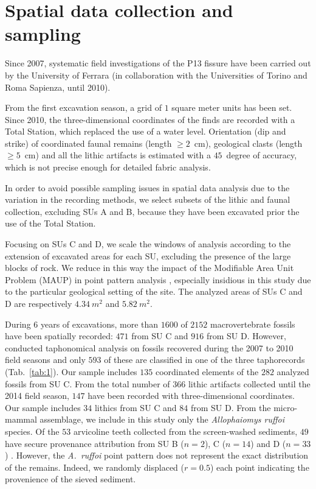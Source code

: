 \documentclass[review,authoryear]{elsarticle} %
\begin{document}
\section{Spatial data collection and sampling}

Since 2007, systematic field investigations of the P13 fissure have been carried out by the University of Ferrara (in collaboration with the Universities of Torino and Roma Sapienza, until 2010).

From the first excavation season, a grid of $1$ square meter units has been set. Since 2010, the three-dimensional coordinates of the finds are recorded with a Total Station, which replaced the use of a water level. Orientation (dip and strike) of coordinated faunal remains (length $\geq2$~cm), geological clasts (length $\geq5$~cm) and all the lithic artifacts is estimated with a $45$~degree of accuracy, which is not precise enough for detailed fabric analysis.

In order to avoid possible sampling issues in spatial data analysis due to the variation in the recording methods, we select subsets of the lithic and faunal collection, excluding SUs A and B, because they have been excavated prior the use of the Total Station.

Focusing on SUs C and D, we scale the windows of analysis according to the extension of excavated areas for each SU, excluding the presence of the large blocks of rock. We reduce in this way the impact of the Modifiable Area Unit Problem (MAUP) in point pattern analysis \citep{Openshaw1996}, especially insidious in this study due to the particular geological setting of the site. The analyzed areas of SUs C and D are respectively $4.34~m^{2}$ and $5.82~m^{2}$.

During 6 years of excavations, more than $1600$ of $2152$ macrovertebrate fossils have been spatially recorded: $471$ from SU C and $916$ from SU D. However, \citet{Bagnus2011} conducted taphonomical analysis on fossils recovered during the 2007 to 2010 field seasons and only $593$ of these are classified in one of the three taphorecords (Tab.~\ref{tab:1}). Our sample includes $135$ coordinated elements of the $282$ analyzed fossils from SU C. From the total number of $366$ lithic artifacts collected until the 2014 field season, $147$ have been recorded with three-dimensional coordinates. Our sample includes $34$ lithics from SU C and $84$ from SU D. From the micro-mammal assemblage, we include in this study only the \emph{Allophaiomys ruffoi} species. Of the $53$ arvicoline teeth collected from the screen-washed sediments, $49$ have secure provenance attribution from SU B ($n=2$), C ($n=14$) and D ($n=33$) \citep{Lopez-Garcia2015}. However, the \emph{A.~ruffoi} point pattern does not represent the exact distribution of the remains. Indeed, we randomly displaced ($r=0.5$) each point indicating the provenience of the sieved sediment.
\end{document}
